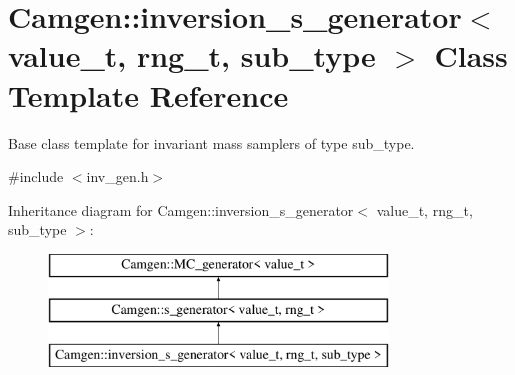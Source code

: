\hypertarget{a00317}{\section{Camgen\-:\-:inversion\-\_\-s\-\_\-generator$<$ value\-\_\-t, rng\-\_\-t, sub\-\_\-type $>$ Class Template Reference}
\label{a00317}
}


Base class template for invariant mass samplers of type sub\-\_\-type.  




{\ttfamily \#include $<$inv\-\_\-gen.\-h$>$}

Inheritance diagram for Camgen\-:\-:inversion\-\_\-s\-\_\-generator$<$ value\-\_\-t, rng\-\_\-t, sub\-\_\-type $>$\-:\begin{figure}[H]
\begin{center}
\leavevmode
\includegraphics[height=3.000000cm]{a00317}
\end{center}
\end{figure}

